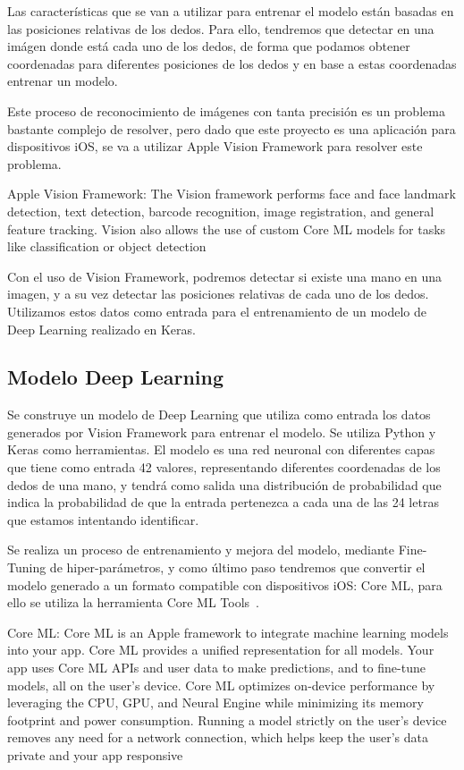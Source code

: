 \documentclass[../main.tex]{subfiles}
\begin{document}
Las características que se van a utilizar para entrenar el modelo están basadas en las posiciones relativas de los dedos. Para ello, tendremos que detectar en una imágen donde está cada uno de los dedos, de forma que podamos obtener coordenadas para diferentes posiciones de los dedos y en base a estas coordenadas entrenar un modelo.

Este proceso de reconocimiento de imágenes con tanta precisión es un problema bastante complejo de resolver, pero dado que este proyecto es una aplicación para dispositivos iOS, se va a utilizar Apple Vision Framework para resolver este problema.

\newpage 

Apple Vision Framework: The Vision framework performs face and face landmark detection, text detection, barcode recognition, image registration, and general feature tracking. Vision also allows the use of custom Core ML models for tasks like classification or object detection~\cite{Vision}

Con el uso de Vision Framework, podremos detectar si existe una mano en una imagen, y a su vez detectar las posiciones relativas de cada uno de los dedos. Utilizamos estos datos como entrada para el entrenamiento de un modelo de Deep Learning realizado en Keras.


\subsection {Modelo Deep Learning}

Se construye un modelo de Deep Learning que utiliza como entrada los datos generados por Vision Framework para entrenar el modelo. Se utiliza Python y Keras como herramientas. El modelo es una red neuronal con diferentes capas que tiene como entrada 42 valores, representando diferentes coordenadas de los dedos de una mano, y tendrá como salida una distribución de probabilidad que indica la probabilidad de que la entrada pertenezca a cada una de las 24 letras que estamos intentando identificar. 

Se realiza un proceso de entrenamiento y mejora del modelo, mediante Fine-Tuning de hiper-parámetros, y como último paso tendremos que convertir el modelo generado a un formato compatible con dispositivos iOS: Core ML, para ello se utiliza la herramienta Core ML Tools~\cite{COREMLTOOLS}.

Core ML: Core ML is an Apple framework to integrate machine learning models into your app. Core ML provides a unified representation for all models. Your app uses Core ML APIs and user data to make predictions, and to fine-tune models, all on the user’s device. Core ML optimizes on-device performance by leveraging the CPU, GPU, and Neural Engine while minimizing its memory footprint and power consumption. Running a model strictly on the user’s device removes any need for a network connection, which helps keep the user’s data private and your app responsive~\cite{COREML}
\end{document}
